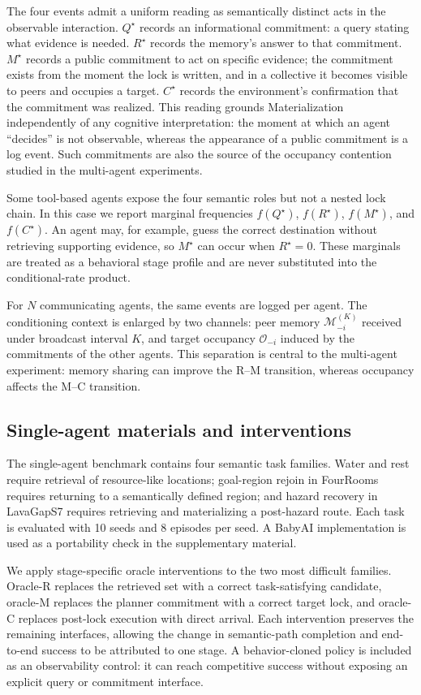 \documentclass[letterpaper]{article} %
\begin{document}
The four events admit a uniform reading as semantically distinct acts in the observable interaction. $Q^\star$ records an informational commitment: a query stating what evidence is needed. $R^\star$ records the memory's answer to that commitment. $M^\star$ records a public commitment to act on specific evidence; the commitment exists from the moment the lock is written, and in a collective it becomes visible to peers and occupies a target. $C^\star$ records the environment's confirmation that the commitment was realized. This reading grounds Materialization independently of any cognitive interpretation: the moment at which an agent ``decides'' is not observable, whereas the appearance of a public commitment is a log event. Such commitments are also the source of the occupancy contention studied in the multi-agent experiments.

Some tool-based agents expose the four semantic roles but not a nested lock chain. In this case we report marginal frequencies $f(Q^\star)$, $f(R^\star)$, $f(M^\star)$, and $f(C^\star)$. An agent may, for example, guess the correct destination without retrieving supporting evidence, so $M^\star$ can occur when $R^\star=0$. These marginals are treated as a behavioral stage profile and are never substituted into the conditional-rate product.

For $N$ communicating agents, the same events are logged per agent. The conditioning context is enlarged by two channels: peer memory $\mathcal{M}^{(K)}_{-i}$ received under broadcast interval $K$, and target occupancy $\mathcal{O}_{-i}$ induced by the commitments of the other agents. This separation is central to the multi-agent experiment: memory sharing can improve the R--M transition, whereas occupancy affects the M--C transition.

\subsection{Single-agent materials and interventions}

The single-agent benchmark contains four semantic task families. Water and rest require retrieval of resource-like locations; goal-region rejoin in FourRooms requires returning to a semantically defined region; and hazard recovery in LavaGapS7 requires retrieving and materializing a post-hazard route. Each task is evaluated with 10 seeds and 8 episodes per seed. A BabyAI implementation is used as a portability check in the supplementary material.

We apply stage-specific oracle interventions to the two most difficult families. Oracle-R replaces the retrieved set with a correct task-satisfying candidate, oracle-M replaces the planner commitment with a correct target lock, and oracle-C replaces post-lock execution with direct arrival. Each intervention preserves the remaining interfaces, allowing the change in semantic-path completion and end-to-end success to be attributed to one stage. A behavior-cloned policy is included as an observability control: it can reach competitive success without exposing an explicit query or commitment interface.
\end{document}
